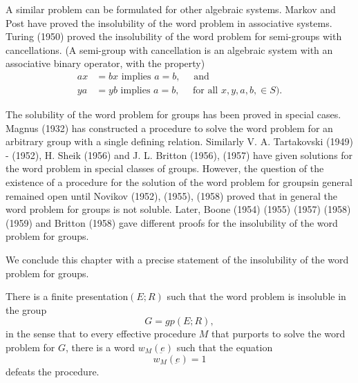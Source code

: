 A similar problem can be formulated for other algebraic
systems. Markov and Post have proved the insolubility of the word
problem in associative systems. Turing (1950) proved the insolubility
of the word problem for semi-groups with cancellations. (A semi-group
with cancellation is an algebraic system with an associative binary
operator, with the property) 
\begin{align*}
  ax &= bx \text{ implies } a = b, \quad \text{ and }\\
  ya &= yb \text{ implies } a = b, \quad \text{ for all } x, y, a,
  b,\in  S ). 
\end{align*}

The solubility of the word problem for groups has been proved in
special cases. Magnus (1932) has constructed a procedure to solve the
word problem for an arbitrary group with a single defining
relation. Similarly V. A. Tartakovski (1949) - (1952), H. Sheik (1956)
and J. L. Britton (1956), (1957) have given solutions for the word
problem in special classes of groups. However, the question of the
existence of a procedure for the solution of the word problem for
groups\pageoriginale in general remained open until Novikov (1952), (1955), (1958)
proved that in general the word problem for groups is not
soluble. Later, Boone (1954) (1955) (1957) (1958) (1959) and Britton
(1958) gave different proofs for the insolubility of the word problem
for groups. 

We conclude this chapter with a precise statement of the insolubility
of the word problem for groups. 

\begin{theorem*} 
  There is a finite presentation\break $(E ; R)$ such that the word problem
  is insoluble in the group 
  $$
  G = gp(E ; R),
  $$
  in the sense that to every effective procedure $M$ that purports to
  solve the word problem for $G$, there is a word $w_M (\underbar{e})$
  such that the equation 
  $$
  w_M (\underbar{e}) =1
  $$
  defeats the procedure.
\end{theorem*}
